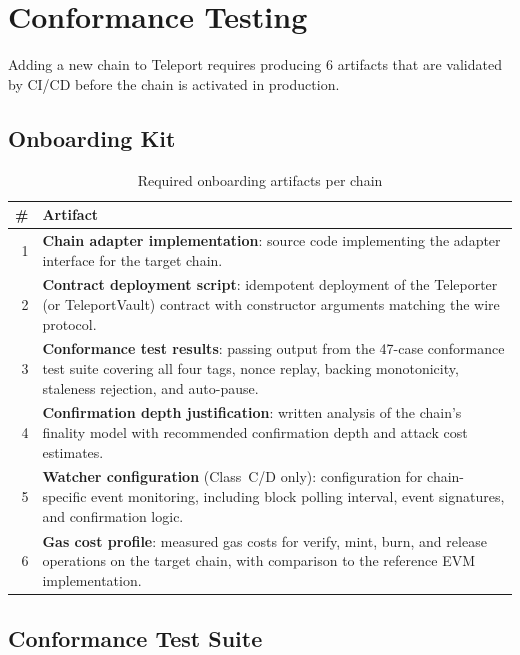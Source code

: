 \section{Conformance Testing}

\label{sec:conformance}

Adding a new chain to Teleport requires producing 6 artifacts that are validated by CI/CD before the chain is activated in production.

\subsection{Onboarding Kit}

\begin{table}[H]
\centering
\begin{tabular}{rp{9cm}}
\toprule
\textbf{\#} & \textbf{Artifact} \\
\midrule
1 & \textbf{Chain adapter implementation}: source code implementing the adapter interface for the target chain. \\
2 & \textbf{Contract deployment script}: idempotent deployment of the Teleporter (or TeleportVault) contract with constructor arguments matching the wire protocol. \\
3 & \textbf{Conformance test results}: passing output from the 47-case conformance test suite covering all four tags, nonce replay, backing monotonicity, staleness rejection, and auto-pause. \\
4 & \textbf{Confirmation depth justification}: written analysis of the chain's finality model with recommended confirmation depth and attack cost estimates. \\
5 & \textbf{Watcher configuration} (Class~C/D only): configuration for chain-specific event monitoring, including block polling interval, event signatures, and confirmation logic. \\
6 & \textbf{Gas cost profile}: measured gas costs for verify, mint, burn, and release operations on the target chain, with comparison to the reference EVM implementation. \\
\bottomrule
\end{tabular}
\caption{Required onboarding artifacts per chain}
\label{tab:artifacts}
\end{table}

\subsection{Conformance Test Suite}

